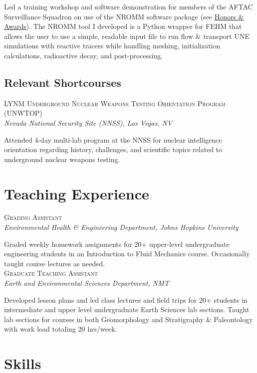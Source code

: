 \documentclass[11pt, letterpaper]{article}
\newcommand{\years}[1]{\marginnote{\scriptsize #1}}
\begin{document}
    Led a training workshop and software demonstration for members of the AFTAC
     Surveillance Squadron on use of the NROMM software package (see
    \hyperref[sec:awards]{Honors \& Awards}).  The NROMM tool I developed is a
    Python wrapper for FEHM that allows the user to use a simple, readable
    input file to run flow \& transport UNE simulations with reactive tracers
    while handling meshing, initialization calculations, radioactive decay, and
    post-processing.

\subsection*{Relevant Shortcourses}
\label{sec:shortcourses}
\years{2023} \textsc{LYNM Underground Nuclear Weapons Testing Orientation Program (UNWTOP)}\\
\textit{Nevada National Security Site (NNSS), Las Vegas, NV}

    Attended 4-day multi-lab program at the NNSS for nuclear intelligence
    orientation regarding history, challenges, and scientific topics related to
    underground nuclear weapons testing. 


\section*{Teaching Experience}
\noindent
\years{2019}\textsc{Grading Assistant}\\
\textit{Environmental Health \& Engineering Department, Johns Hopkins University}

	Graded weekly homework assignments for 20+ upper-level undergraduate
	engineering students in an Introduction to Fluid Mechanics course.
	Occasionally taught course lectures as needed.\\

\years{2015 - 2016}\textsc{Graduate Teaching Assistant}\\
\textit{Earth and Environmental Sciences Department, NMT}

    Developed lesson plans and led class lectures and field trips for 20+
    students in intermediate and upper level undergraduate Earth Sciences lab
    sections. Taught lab sections for courses in both Geomorphology and Stratigraphy
    \& Paleontology with work load totaling 20 hrs/week.  

\section*{Skills}
\setlength{\parskip}{5pt}
\end{document}
